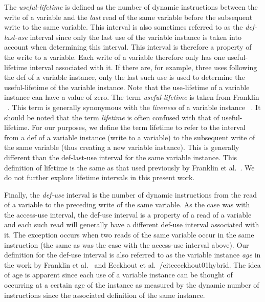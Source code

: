 \documentclass[10pt,dvips]{article}
\begin{document}
The \textit{useful-lifetime} is defined as the number of
dynamic instructions between the write of a variable
and the \textit{last} read of the same variable before the
subsequent write to the same variable.
This interval is also sometimes referred to as the \textit{def-last-use}
interval since only the last use of the variable instance is taken
into account when determining this interval.
This interval is therefore a property of the write to a variable.
Each write of a variable therefore only has one
useful-lifetime interval associated with it.
If there are, for example, three uses following the
def of a variable instance, only the last such use is
used to determine the useful-lifetime of the variable instance.
Note that the use-lifetime of a variable instance can have a value of 
zero.
The term \textit{useful-lifetime} is taken from Franklin ~\cite{Franklin92}.
This term is generally synonymous with the \textit{liveness} of
a variable instance ~\cite{hennpatt95}.
It should be noted that the term \textit{lifetime} is often confused
with that of useful-lifetime.
For our purposes, we define the term lifetime to refer to
the interval from a def of a variable instance (write to a variable)
to the
subsequent write of the same variable (thus creating a new
variable instance).
This is generally different than the def-last-use interval
for the same variable instance.
This definition of lifetime is the same as that used previously by
Franklin et al.~\cite{Franklin92}.
We do not further explore lifetime intervals in this
present work.

Finally, the \textit{def-use} interval is the number of
dynamic
instructions from the read of a variable to the preceding write
of the same variable.
As the case was with the access-use interval,
the def-use interval is a property of a read of a variable
and each such read will generally have a 
different def-use interval associated with it.
The exception occurs when two reads of the same variable occur in 
the same instruction (the
same as was the case with the access-use interval above).
Our definition for the def-use interval is also referred to
as the variable instance \textit{age} in the work by 
Franklin et al.~\cite{Franklin92} and 
Eeckhout et al.~/cite{eeckhout01hybrid}.
The idea of age is apparent since each use of a variable instance
can be thought of occurring at a certain age of the instance as
measured by the dynamic number of instructions since the associated
definition of the same instance.
\end{document}
